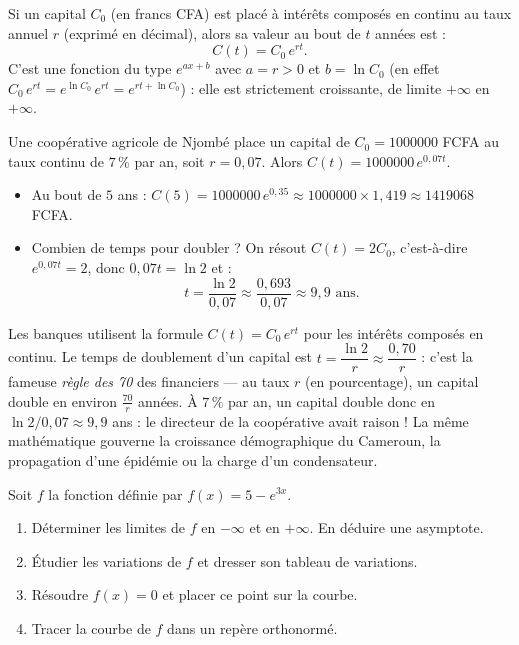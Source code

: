 \documentclass[11pt]{article}
\begin{document}
\begin{propriete}
Si un capital $C_0$ (en francs CFA) est placé à intérêts composés en continu au taux annuel $r$ (exprimé en décimal), alors sa valeur au bout de $t$ années est :
\[ C(t) = C_0\,e^{rt}. \]
C'est une fonction du type $e^{ax+b}$ avec $a = r > 0$ et $b = \ln C_0$ (en effet $C_0\,e^{rt} = e^{\ln C_0}\,e^{rt} = e^{rt + \ln C_0}$) : elle est strictement croissante, de limite $+\infty$ en $+\infty$.
\end{propriete}

\begin{exemplebox}
Une coopérative agricole de Njombé place un capital de $C_0 = \num{1000000}$ FCFA au taux continu de $7\,\%$ par an, soit $r = 0{,}07$. Alors $C(t) = \num{1000000}\,e^{0{,}07t}$.
\begin{itemize}
\item Au bout de $5$ ans : $C(5) = \num{1000000}\,e^{0{,}35} \approx \num{1000000} \times 1{,}419 \approx \num{1419068}$ FCFA.
\item Combien de temps pour doubler ? On résout $C(t) = 2C_0$, c'est-à-dire $e^{0{,}07t} = 2$, donc $0{,}07t = \ln 2$ et :
\[ t = \frac{\ln 2}{0{,}07} \approx \frac{0{,}693}{0{,}07} \approx 9{,}9 \text{ ans}. \]
\end{itemize}
\end{exemplebox}

\begin{savaistu}
Les banques utilisent la formule $C(t) = C_0\,e^{rt}$ pour les intérêts composés en continu. Le temps de doublement d'un capital est $t = \dfrac{\ln 2}{r} \approx \dfrac{0{,}70}{r}$ : c'est la fameuse \emph{règle des 70} des financiers — au taux $r$ (en pourcentage), un capital double en environ $\frac{70}{r}$ années. À $7\,\%$ par an, un capital double donc en $\ln 2 / 0{,}07 \approx 9{,}9$ ans : le directeur de la coopérative avait raison ! La même mathématique gouverne la croissance démographique du Cameroun, la propagation d'une épidémie ou la charge d'un condensateur.
\end{savaistu}

\begin{exercice}
Soit $f$ la fonction définie par $f(x) = 5 - e^{3x}$.
\begin{enumerate}
\item Déterminer les limites de $f$ en $-\infty$ et en $+\infty$. En déduire une asymptote.
\item Étudier les variations de $f$ et dresser son tableau de variations.
\item Résoudre $f(x) = 0$ et placer ce point sur la courbe.
\item Tracer la courbe de $f$ dans un repère orthonormé.
\end{enumerate}
\end{exercice}
\end{document}
